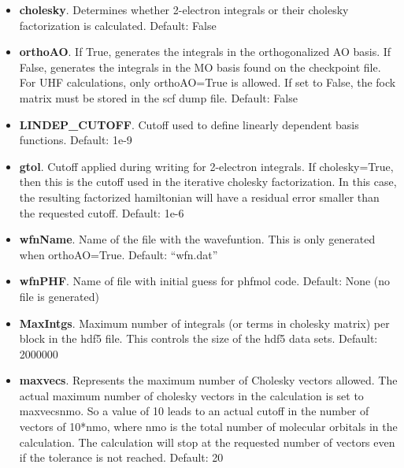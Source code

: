 \begin{itemize}
\item \textbf{cholesky}. Determines whether 2-electron integrals or their cholesky factorization is calculated.
  Default: False
\item \textbf{orthoAO}. If True, generates the integrals in the orthogonalized AO basis. If False, generates the integrals in the MO basis found on the checkpoint file. For UHF calculations, only orthoAO=True is allowed. If set to False, the fock matrix must be stored in the scf dump file.
  Default: False
\item \textbf{LINDEP\_CUTOFF}.  Cutoff used to define linearly dependent basis functions.
  Default: 1e-9
\item \textbf{gtol}. Cutoff applied during writing for 2-electron integrals. If cholesky=True, then this is the cutoff used in the iterative cholesky factorization. In this case, the resulting factorized hamiltonian will have a residual error smaller than the requested cutoff.
  Default: 1e-6
\item \textbf{wfnName}. Name of the file with the wavefuntion. This is only generated  when orthoAO=True.
  Default: ``wfn.dat''
\item \textbf{wfnPHF}. Name of file with initial guess for phfmol code.
  Default: None (no file is generated)
\item \textbf{MaxIntgs}. Maximum number of integrals  (or terms in cholesky matrix) per block in the hdf5 file. This controls the size of the hdf5 data sets.
  Default: 2000000
\item \textbf{maxvecs}. Represents the maximum number of Cholesky vectors allowed. The actual maximum number of cholesky vectors in the calculation is set to maxvecsnmo. So a value of 10 leads to an actual cutoff in the number of vectors of 10*nmo, where nmo is the total number of molecular orbitals in the calculation. The calculation will stop at the requested number of vectors even if the tolerance is not reached.
  Default: 20
\end{itemize}
